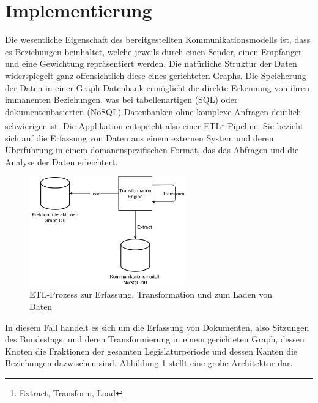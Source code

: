 \section{Implementierung}\label{sec:06_04_implementierung}
Die wesentliche Eigenschaft des bereitgestellten Kommunikationsmodells ist, dass es Beziehungen beinhaltet, welche jeweils durch einen Sender, einen Empfänger und eine 
Gewichtung repräsentiert werden. 
Die natürliche Struktur der Daten widerspiegelt ganz offensichtlich diese eines gerichteten Graphs. 
Die Speicherung der Daten in einer Graph-Datenbank ermöglicht die direkte Erkennung von ihren immanenten Beziehungen, was bei tabellenartigen (SQL) oder dokumentenbasierten (NoSQL) Datenbanken ohne komplexe Anfragen deutlich schwieriger ist. 
Die Applikation entspricht also einer ETL\footnote{Extract, Transform, Load}-Pipeline. Sie bezieht sich auf die Erfassung von Daten aus einem externen System und deren Überführung in einem domänenspezifischen
Format, das das Abfragen und die Analyse der Daten erleichtert. 
\begin{figure}[H]
    \centering
    \includegraphics[width=0.60\textwidth]{images/ETL_Factions.png}
    \caption{ETL-Prozess zur Erfassung, Transformation und zum Laden von Daten}
    \label{fig:faction-etl}
\end{figure}
In diesem Fall handelt es sich um die Erfassung von Dokumenten, also Sitzungen des Bundestags, und deren Transformierung in einem gerichteten Graph, dessen Knoten
die Fraktionen der gesamten Legislaturperiode und dessen Kanten die Beziehungen dazwischen sind. Abbildung \ref{fig:faction-etl} stellt eine grobe Architektur dar.  